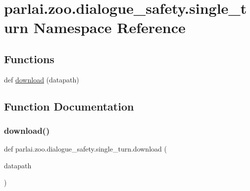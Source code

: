 \hypertarget{namespaceparlai_1_1zoo_1_1dialogue__safety_1_1single__turn}{}\section{parlai.\+zoo.\+dialogue\+\_\+safety.\+single\+\_\+turn Namespace Reference}
\label{namespaceparlai_1_1zoo_1_1dialogue__safety_1_1single__turn}
\subsection*{Functions}
\begin{DoxyCompactItemize}
\item 
def \hyperlink{namespaceparlai_1_1zoo_1_1dialogue__safety_1_1single__turn_a16b618bff8b38c10b5ffc4b822b227dc}{download} (datapath)
\end{DoxyCompactItemize}


\subsection{Function Documentation}
\mbox{\label{namespaceparlai_1_1zoo_1_1dialogue__safety_1_1single__turn_a16b618bff8b38c10b5ffc4b822b227dc}} 
\subsubsection{\texorpdfstring{download()}{download()}}
{\footnotesize\ttfamily def parlai.\+zoo.\+dialogue\+\_\+safety.\+single\+\_\+turn.\+download (\begin{DoxyParamCaption}\item[{}]{datapath }\end{DoxyParamCaption})}

